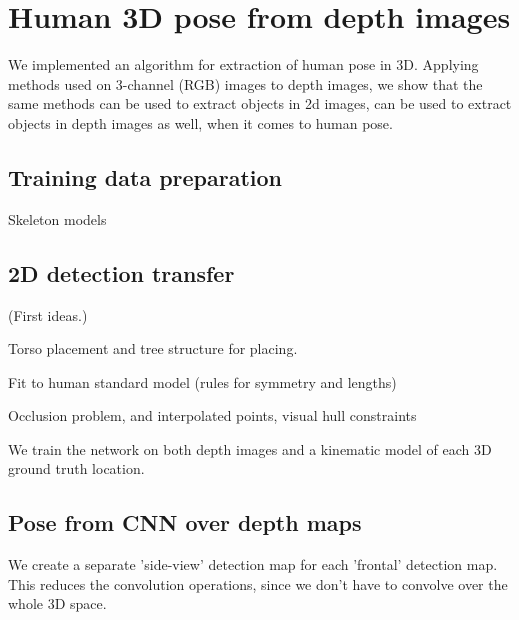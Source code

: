 \chapter{Human 3D pose from depth images}
We implemented an algorithm for extraction of human pose in 3D.
Applying methods used on 3-channel (RGB) images to depth images, we show that the same methods can be used to extract objects in 2d images, can be used to extract objects in depth images as well, when it comes to human pose.



\section{Training data preparation}


Skeleton models


\section{2D detection transfer}

(First ideas.)

Torso placement and tree structure for placing.

Fit to human standard model (rules for symmetry and lengths)

Occlusion problem, and interpolated points, visual hull constraints

We train the network on both depth images and a kinematic model of each 3D ground truth location.

\section{Pose from CNN over depth maps}

We create a separate 'side-view' detection map for each 'frontal' detection map. This reduces the convolution operations, since we don't have to convolve over the whole 3D space.
